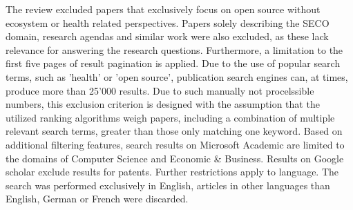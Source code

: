 \documentclass[final,5p,times,twocolumn]{elsarticle}
\begin{document}
The review excluded papers that exclusively focus on open source without ecosystem or health related perspectives. Papers solely describing the SECO domain, research agendas and similar work were also excluded, as these lack relevance for answering the research questions. Furthermore, a limitation to the first five pages of result pagination is applied. Due to the use of popular search terms, such as 'health' or 'open source', publication search engines can, at times, produce more than 25'000 results. Due to such manually not procelssible numbers, this exclusion criterion is designed with the assumption that the utilized ranking algorithms weigh papers, including a combination of multiple relevant search terms, greater than those only matching one keyword. Based on additional filtering features, search results on Microsoft Academic are limited to the domains of Computer Science and Economic \& Business. Results on Google scholar exclude results for patents. Further restrictions apply to language. The search was performed exclusively in English, articles in other languages than English, German or French were discarded.
\end{document}

